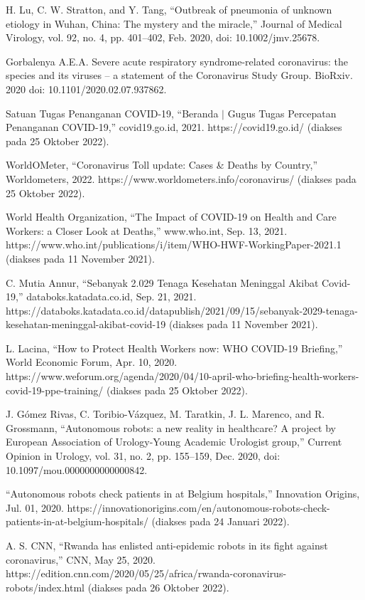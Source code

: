 H. Lu, C. W. Stratton, and Y. Tang, “Outbreak of pneumonia of unknown etiology in Wuhan, China: The mystery and the miracle,” Journal of Medical Virology, vol. 92, no. 4, pp. 401–402, Feb. 2020, doi: 10.1002/jmv.25678.

Gorbalenya A.E.A. Severe acute respiratory syndrome-related coronavirus: the species and its viruses – a statement of the Coronavirus Study Group. BioRxiv. 2020 doi: 10.1101/2020.02.07.937862.

Satuan Tugas Penanganan COVID-19, “Beranda $|$ Gugus Tugas Percepatan Penanganan COVID-19,” covid19.go.id, 2021. https://covid19.go.id/ (diakses pada 25 Oktober 2022).

WorldOMeter, “Coronavirus Toll update: Cases \& Deaths by Country,” Worldometers, 2022. https://www.worldometers.info/coronavirus/ (diakses pada 25 Oktober 2022).

World Health Organization, “The Impact of COVID-19 on Health and Care Workers: a Closer Look at Deaths,” www.who.int, Sep. 13, 2021. https://www.who.int/publications/i/item/WHO-HWF-WorkingPaper-2021.1 (diakses pada 11 November 2021).

C. Mutia Annur, “Sebanyak 2.029 Tenaga Kesehatan Meninggal Akibat Covid-19,” databoks.katadata.co.id, Sep. 21, 2021. https://databoks.katadata.co.id/datapublish/2021/09/15/sebanyak-2029-tenaga-kesehatan-meninggal-akibat-covid-19 (diakses pada 11 November 2021).

L. Lacina, “How to Protect Health Workers now: WHO COVID-19 Briefing,” World Economic Forum, Apr. 10, 2020. https://www.weforum.org/agenda/2020/04/10-april-who-briefing-health-workers-covid-19-ppe-training/ (diakses pada 25 Oktober 2022).

J. Gómez Rivas, C. Toribio-Vázquez, M. Taratkin, J. L. Marenco, and R. Grossmann, “Autonomous robots: a new reality in healthcare? A project by European Association of Urology-Young Academic Urologist group,” Current Opinion in Urology, vol. 31, no. 2, pp. 155–159, Dec. 2020, doi: 10.1097/mou.0000000000000842.

“Autonomous robots check patients in at Belgium hospitals,” Innovation Origins, Jul. 01, 2020. https://innovationorigins.com/en/autonomous-robots-check-patients-in-at-belgium-hospitals/ (diakses pada 24 Januari 2022).

A. S. CNN, “Rwanda has enlisted anti-epidemic robots in its fight against coronavirus,” CNN, May 25, 2020. https://edition.cnn.com/2020/05/25/africa/rwanda-coronavirus-robots/index.html (diakses pada 26 Oktober 2022).

